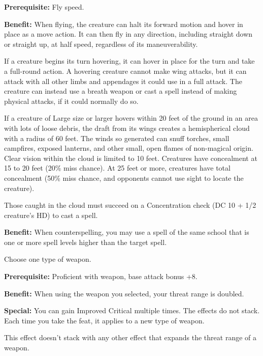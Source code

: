
\textbf{Prerequisite:} Fly speed.

\textbf{Benefit:} When flying, the creature can halt its forward motion and hover in place as a move action. It can then fly in any direction, including straight down or straight up, at half speed, regardless of its maneuverability.

If a creature begins its turn hovering, it can hover in place for the turn and take a full-round action. A hovering creature cannot make wing attacks, but it can attack with all other limbs and appendages it could use in a full attack. The creature can instead use a breath weapon or cast a spell instead of making physical attacks, if it could normally do so.

If a creature of Large size or larger hovers within 20 feet of the ground in an area with lots of loose debris, the draft from its wings creates a hemispherical cloud with a radius of 60 feet. The winds so generated can snuff torches, small campfires, exposed lanterns, and other small, open flames of non-magical origin. Clear vision within the cloud is limited to 10 feet. Creatures have concealment at 15 to 20 feet (20\% miss chance). At 25 feet or more, creatures have total concealment 
(50\% miss chance, and opponents cannot use sight to locate the creature).

Those caught in the cloud must succeed on a Concentration check (DC 10 + 1/2 creature's HD) to cast a spell.


\textbf{Benefit:} When counterspelling, you may use a spell of the same school that is one or more spell levels higher than the target spell.


Choose one type of weapon.

\textbf{Prerequisite:} Proficient with weapon, base attack bonus +8.

\textbf{Benefit:} When using the weapon you selected, your threat range is doubled.

\textbf{Special:} You can gain Improved Critical multiple times. The effects do not stack. Each time you take the feat, it applies to a new type of weapon.

This effect doesn't stack with any other effect that expands the threat range of a weapon.


